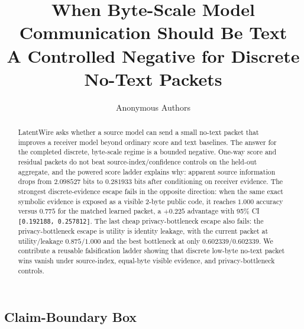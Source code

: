 \documentclass{article}
\title{When Byte-Scale Model Communication Should Be Text\\\large A Controlled Negative for Discrete No-Text Packets}
\author{Anonymous Authors}
\begin{document}
\ifcolmsubmission
\linenumbers
\fi
\maketitle

\begin{abstract}
LatentWire asks whether a source model can send a small no-text packet
that improves a receiver model beyond ordinary score and text baselines.
The answer for the completed discrete, byte-scale regime is a bounded
negative. One-way score and residual packets do not beat
source-index/confidence controls on the held-out aggregate, and the
powered score ladder explains why: apparent source information drops
from \(2.098527\) bits to \(0.281933\) bits after conditioning
on receiver evidence. The strongest discrete-evidence escape fails in
the opposite direction: when the same exact symbolic evidence is exposed
as a visible 2-byte public code, it reaches \(1.000\) accuracy
versus \(0.775\) for the matched learned packet, a \(+0.225\)
advantage with 95\% CI \texttt{{[}0.192188,\ 0.257812{]}}. The last
cheap privacy-bottleneck escape also fails: the privacy-bottleneck
escape is utility is identity leakage, with the current
packet at utility/leakage \(0.875/1.000\) and the best bottleneck
at only \(0.602339/0.602339\). We contribute a reusable
falsification ladder showing that discrete low-byte no-text packet wins
vanish under source-index, equal-byte visible evidence, and
privacy-bottleneck controls.
\end{abstract}

\hypertarget{claim-boundary-box}{%
\subsection{Claim-Boundary Box}\label{claim-boundary-box}}
\end{document}
